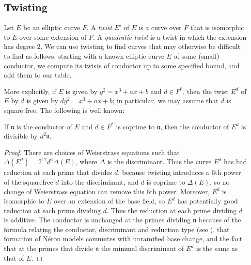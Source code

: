 \documentclass{amsart}
\newcommand{\n}{\mathfrak{n}}
\begin{document}
\subsection{Twisting}\label{sec:twisting}

Let $E$ be an elliptic curve $F$. A \emph{twist} $E'$ of $E$ is a
curve over $F$ that is isomorphic to $E$ over some extension of $F$. A
\emph{quadratic twist} is a twist in which the extension has degree
$2$.  We can use twisting to find curves that may otherwise be
difficult to find as follows: starting with a known elliptic curve $E$
of some (small) conductor, we compute its twists of conductor up to
some specified bound, and add them to our table.

More explicitly, if $E$ is given by $y^2=x^3+ax+b$ and $d\in F^*$,
then the twist $E^d$ of $E$ by $d$ is given by $dy^2=x^3+ax+b$; in
particular, we may assume that $d$ is square free.  The following
is well known:
\begin{proposition}\label{twist:bound}
If $\n$ is the
conductor of $E$ and $d \in F^*$ is coprime to $\n$, then the
conductor of $E^d$ is divisible by $d^2\n$.
\end{proposition}
\begin{proof}
There are choices of Weierstrass equations such that 
$\Delta(E^d) = 2^{12} d^6 \Delta(E)$, where $\Delta$
is the discriminant.
Thus the curve $E^d$ has bad reduction at each prime that divides $d$,
because twisting introduces a $6$th power of the squarefree $d$ into
the discriminant, and $d$ is coprime to $\Delta(E)$, so no change of
Weierstrass equation can remove this $6$th power.  Moreover, $E^d$ is
isomorphic to $E$ over an extension of the base field, so $E^d$ has
potentially good reduction at each prime dividing $d$.  Thus the
reduction at each prime dividing $d$ is additive.  The conductor is
unchanged at the primes dividing $\n$ because of the formula relating
the conductor, discriminant and reduction type (see \cite[App.~C,\S15]{silverman:aec}),
that formation of N\'eron models commutes with unramified base change,
and the fact that at the primes that divide $\n$ the minimal discriminant of $E^d$ is
the same as that of $E$.
%
\end{proof}
\end{document}
